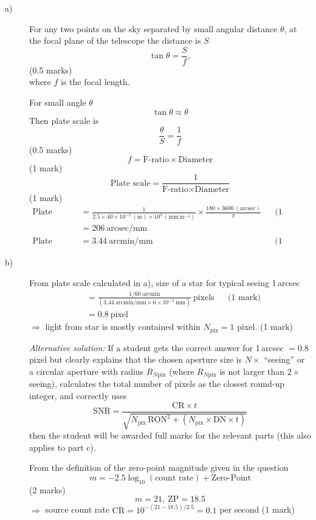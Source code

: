 \begin{description}
\item[a)]
For any two points on the sky separated by small angular distance $\theta$,
at the focal plane of the telescope the distance is $S$
\[ \tan\theta = \frac{S}{f}, \]
\hfill(0.5 marks)\\
where $f$ is the focal length.

For small angle $\theta$
\[ \tan\theta \approx \theta \]
Then plate scale is
\[ \frac{\theta}{S} = \frac{1}{f} \]
\hfill(0.5 marks)
\[ f = \text{F-ratio} \times \text{Diameter} \]
\hfill(1 mark)
\[ \text{Plate scale} = \frac{1}{\text{F-ratio} \times \text{Diameter}} \]
\hfill(1 mark)
\begin{align*}
\text{Plate Scale}
  &= \frac{1}{2.5 \times 40 \times 10^{-2}\,(\mathrm{m})
     \times 10^{3}\,(\mathrm{mm\,m^{-1}})}
     \times \frac{180 \times 3600\,(\mathrm{arcsec})}{\pi}
  && \text{(1 mark)} \\
  &= 206~\mathrm{arcsec/mm} \\
\text{Plate Scale} &= 3.44~\mathrm{arcmin/mm}
  && \text{(1 mark)}
\end{align*}

\item[b)]
From plate scale calculated in a), size of a star for typical seeing 1\,arcsec
\begin{align*}
  &= \frac{1/60~\mathrm{arcmin}}
     {\left(3.44~\mathrm{arcmin/mm} \times 6 \times 10^{-3}~\mathrm{mm}\right)}
     ~\text{pixels}
  && \text{(1 mark)} \\
  &= 0.8~\text{pixel}
\end{align*}
$\Rightarrow$ light from star is mostly contained within
$N_{\mathrm{pix}} = 1$ pixel. \hfill(1 mark)

\emph{Alternative solution:} If a student gets the correct answer for
1\,arcsec $= 0.8$ pixel but clearly explains that the chosen aperture size is
$N \times$ ``seeing'' or a circular aperture with radius $R_{N\mathrm{pix}}$
(where $R_{N\mathrm{pix}}$ is not larger than $2\times$ seeing), calculates
the total number of pixels as the closest round-up integer, and correctly uses
\[ \mathrm{SNR} = \frac{\mathrm{CR} \times t}
   {\sqrt{N_{\mathrm{pix}}\,\mathrm{RON}^2
    + (N_{\mathrm{pix}} \times \mathrm{DN} \times t)}} \]
then the student will be awarded full marks for the relevant parts (this
also applies to part c).

From the definition of the zero-point magnitude given in the question
\[ m = -2.5\log_{10}(\text{count rate}) + \text{Zero-Point} \]
\hfill(2 marks)
\[ m = 21,~\mathrm{ZP} = 18.5 \]
$\Rightarrow$ source count rate
$\mathrm{CR} = 10^{-(21-18.5)/2.5} = 0.1$ per second \hfill(1 mark)


\end{description}
